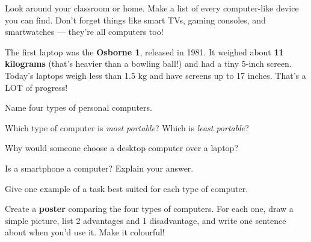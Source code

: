 \begin{tryit}
Look around your classroom or home. Make a list of every computer-like device you can find. Don't forget things like smart TVs, gaming consoles, and smartwatches --- they're all computers too!
\end{tryit}


\begin{funfact}
The first laptop was the \textbf{Osborne 1}, released in 1981. It weighed about \textbf{11 kilograms} (that's heavier than a bowling ball!) and had a tiny 5-inch screen. Today's laptops weigh less than 1.5 kg and have screens up to 17 inches. That's a LOT of progress!
\end{funfact}


\begin{reviewqs}
  \item Name four types of personal computers.
  \item Which type of computer is \emph{most portable}? Which is \emph{least portable}?
  \item Why would someone choose a desktop computer over a laptop?
  \item Is a smartphone a computer? Explain your answer.
  \item Give one example of a task best suited for each type of computer.
\end{reviewqs}

\begin{challenge}
Create a \textbf{poster} comparing the four types of computers. For each one, draw a simple picture, list 2 advantages and 1 disadvantage, and write one sentence about when you'd use it. Make it colourful!
\end{challenge}
